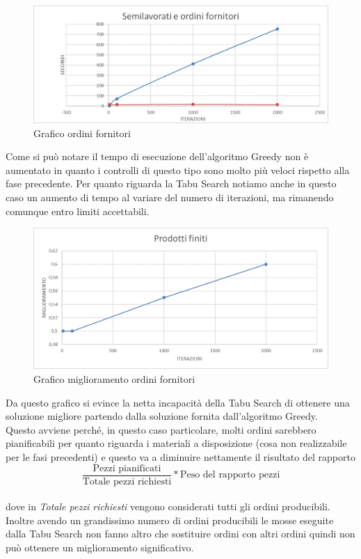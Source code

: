 \begin{figure}[H]
	\includegraphics[width=13cm]{immagini/graficofo2.png}
	\centering
	\caption{Grafico ordini fornitori}
\end{figure}

Come si può notare il tempo di esecuzione dell'algoritmo Greedy non è aumentato in quanto i controlli di questo tipo sono molto più veloci rispetto alla fase precedente.
Per quanto riguarda la Tabu Search notiamo anche in questo caso un aumento di tempo al variare del numero di iterazioni, ma rimanendo comunque entro limiti accettabili.

\begin{figure}[H]
	\includegraphics[width=15cm]{immagini/graficofo3.png}
	\centering
	\caption{Grafico miglioramento ordini fornitori}
\end{figure}

Da questo grafico si evince la netta incapacità della Tabu Search di ottenere una soluzione migliore partendo dalla soluzione fornita dall'algoritmo Greedy.\\
Questo avviene perché, in questo caso particolare, molti ordini sarebbero pianificabili per quanto riguarda i materiali a disposizione (cosa non realizzabile per le fasi
precedenti) e questo va a diminuire nettamente il risultato del rapporto \[\frac{\text{Pezzi pianificati}}{\text{Totale pezzi richiesti}} * \text{Peso del rapporto pezzi}\]\\
dove in \textit{Totale pezzi richiesti} vengono considerati tutti gli ordini producibili.\\ Inoltre avendo un grandissimo numero di ordini producibili le mosse eseguite 
dalla Tabu Search non fanno altro che sostituire ordini con altri ordini quindi non può ottenere un miglioramento significativo.

